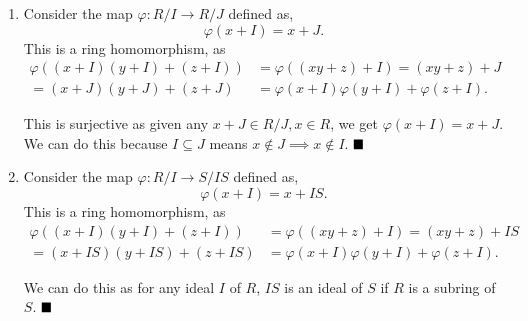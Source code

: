 \documentclass[12pt]{article}
\begin{document}
\textcolor{maroon}{}\begin{enumerate}[label = (\alph*)]
    \item Consider the map \( \varphi: R/I \to R/J \) defined as,
          \[
              \varphi(x + I) = x + J.
          \]
          This is a ring homomorphism, as
          \begin{align*}
              \varphi((x+I)(y+I) + (z+I)) & = \varphi((xy+z)+I) = (xy+z)+J             \\
              = (x+J)(y+J)+(z+J)          & = \varphi(x+I)\varphi(y+I) + \varphi(z+I).
          \end{align*}

          This is surjective as given any \( x+J \in R/J, x \in R \), we get \( \varphi(x+I) = x+J \). We can do this because \( I \subseteq J \) means \( x \notin J \implies x \notin I \). \(\hfill \blacksquare\)
          \smallskip

    \item Consider the map \( \varphi: R/I \to S/IS \) defined as,
          \[
              \varphi(x + I) = x + IS.
          \]
          This is a ring homomorphism, as
          \begin{align*}
              \varphi((x+I)(y+I) + (z+I)) & = \varphi((xy+z)+I) = (xy+z)+IS            \\
              = (x+IS)(y+IS)+(z+IS)       & = \varphi(x+I)\varphi(y+I) + \varphi(z+I).
          \end{align*}


          We can do this as for any ideal \( I \) of \( R \), \( IS \) is an ideal of \( S \) if \( R \) is a subring of \( S \). \(\hfill \blacksquare\)
\end{enumerate}
\end{document}

